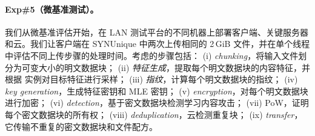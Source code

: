 \paragraph*{Exp\#5（微基准测试）。}
我们从微基准评估开始，在 LAN 测试平台的不同机器上部署客户端、关键服务器和云。我们让客户端在 SYNUnique 中两次上传相同的 2\,GiB 文件，并在单个线程中评估不同上传步骤的处理时间。考虑的步骤包括： (i) {\em chunking}，将输入文件划分为可变大小的明文数据块； (ii) {\em 特征生成}，提取每个明文数据块的内容特征，并根据 \sysnameF 实例对目标特征进行采样； (iii) {\em 指纹}，计算每个明文数据块的指纹； (iv) {\em key generation}，生成特征密钥和 MLE 密钥； (v) {\em encryption}，对每个明文数据块进行加密； (vi) {\em detection}，基于密文数据块检测学习内容攻击； (vii) {PoW}，证明每个密文数据块的所有权； (viii) {\em deduplication}，云检测重复块； (ix) {\em transfer}，它传输不重复的密文数据块和文件配方。



